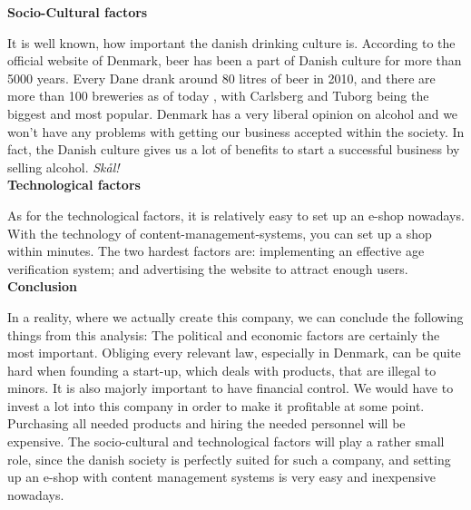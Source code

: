 \documentclass[12p]{article}
\begin{document}
\textbf{Socio-Cultural factors}

It is well known, how important the danish drinking culture is. According to the official website of Denmark, beer has been a part of Danish culture for more than 5000 years. Every Dane drank around 80 litres of beer in 2010, and there are more than 100 breweries as of today \cite{PEST_BeerInDenmark}, with Carlsberg and Tuborg being the biggest and most popular. Denmark has a very liberal opinion on alcohol and we won't have any problems with getting our business accepted within the society. In fact, the Danish culture gives us a lot of benefits to start a successful business by selling alcohol. \emph{Skål!} \\

\textbf{Technological factors}

As for the technological factors, it is relatively easy to set up an e-shop nowadays. With the technology of content-management-systems, you can set up a shop within minutes. The two hardest factors are: implementing an effective age verification system; and advertising the website to attract enough users. \\

\textbf{Conclusion}

In a reality, where we actually create this company, we can conclude the following things from this analysis: The political and economic factors are certainly the most important. Obliging every relevant law, especially in Denmark, can be quite hard when founding a start-up, which deals with products, that are illegal to minors. It is also majorly important to have financial control. We would have to invest a lot into this company in order to make it profitable at some point. Purchasing all needed products and hiring the needed personnel will be expensive. The socio-cultural and technological factors will play a rather small role, since the danish society is perfectly suited for such a company, and setting up an e-shop with content management systems is very easy and inexpensive nowadays.

\newpage

\end{document}
